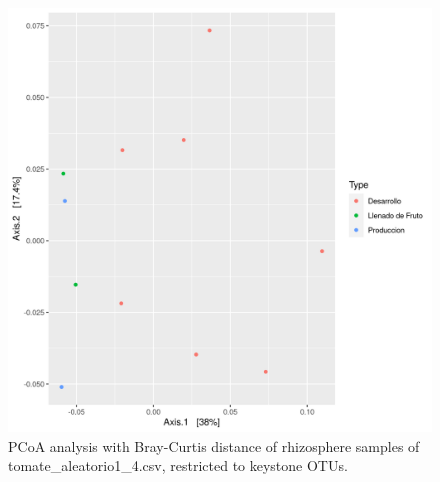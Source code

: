 \begin{figure}
  \centering
  \includegraphics[scale = 0.7]{pcoa_key_otus_tomate_aleatorio1_4.csv.png}
  \caption{PCoA analysis with Bray-Curtis distance of rhizosphere samples of tomate_aleatorio1_4.csv, restricted to keystone OTUs.}
  \label{fig:tomate_aleatorio1_4.csv_pcoa_key_otus}
\end{figure}

